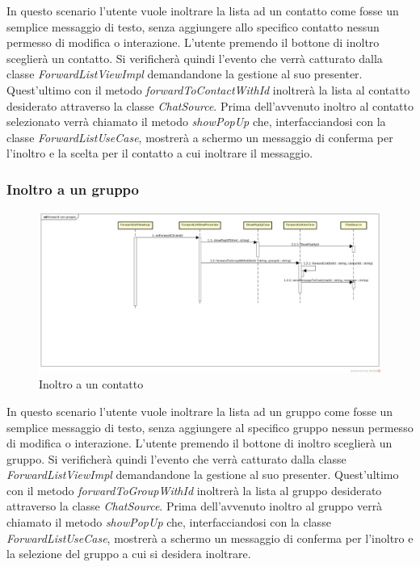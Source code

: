 In questo scenario l'utente vuole inoltrare la lista ad un contatto come fosse un semplice messaggio di testo, senza aggiungere allo specifico contatto nessun permesso di modifica o interazione. L'utente premendo il bottone di inoltro sceglierà un contatto. Si verificherà quindi l'evento che verrà catturato dalla classe \textit{ForwardListViewImpl} demandandone la gestione al suo presenter.
Quest'ultimo con il metodo \textit{forwardToContactWithId} inoltrerà la lista al contatto desiderato attraverso la classe \textit{ChatSource}. Prima dell'avvenuto inoltro al contatto selezionato verrà chiamato il metodo \textit{showPopUp} che, interfacciandosi con la classe \textit{ForwardListUseCase}, mostrerà a schermo un messaggio di conferma per l'inoltro e la scelta per il contatto a cui inoltrare il messaggio.



\subsubsection{Inoltro a un gruppo}

\label{Inoltro a un contatto}
\begin{figure}[H]
	\centering
	\includegraphics[width=\textwidth]{Sezioni/Diagrammi/App/forward_con_gruppo.jpg}
	\caption{Inoltro a un contatto}
	
\end{figure}

In questo scenario l'utente vuole inoltrare la lista ad un gruppo come fosse un semplice messaggio di testo, senza aggiungere al specifico gruppo nessun permesso di modifica o interazione. L'utente premendo il bottone di inoltro sceglierà un gruppo. Si verificherà quindi l'evento che verrà catturato dalla classe \textit{ForwardListViewImpl} demandandone la gestione al suo presenter.
Quest'ultimo con il metodo \textit{forwardToGroupWithId} inoltrerà la lista al gruppo desiderato attraverso la classe \textit{ChatSource}. Prima dell'avvenuto inoltro al gruppo verrà chiamato il metodo \textit{showPopUp} che, interfacciandosi con la classe \textit{ForwardListUseCase}, mostrerà a schermo un messaggio di conferma per l'inoltro e la selezione del gruppo a cui si desidera inoltrare.


